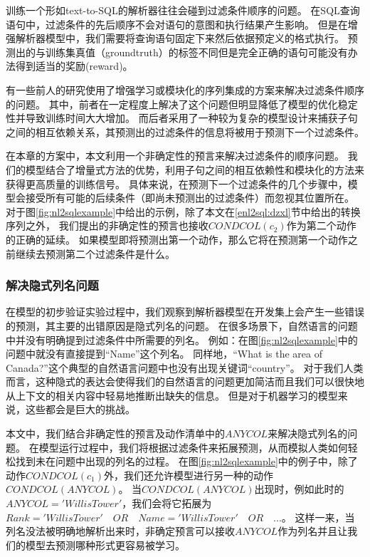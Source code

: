 训练一个形如text-to-SQL的解析器往往会碰到过滤条件顺序的问题。
在SQL查询语句中，过滤条件的先后顺序不会对语句的意图和执行结果产生影响。
但是在增强解析器模型中，我们需要将查询语句固定下来然后依据预定义的格式执行。
预测出的与训练集真值（groundtruth）的标签不同但是完全正确的语句可能没有办法得到适当的奖励(reward)。

有一些前人的研究使用了增强学习\cite{zhong2017seq2sql}或模块化的序列集成\cite{xu2017sqlnet}的方案来解决过滤条件顺序的问题。
其中，前者在一定程度上解决了这个问题但明显降低了模型的优化稳定性并导致训练时间大大增加。
而后者采用了一种较为复杂的模型设计来捕获子句之间的相互依赖关系，其预测出的过滤条件的信息将被用于预测下一个过滤条件。

在本章的方案中，本文利用一个非确定性的预言来解决过滤条件的顺序问题。
我们的模型结合了增量式方法的优势，利用子句之间的相互依赖性和模块化的方法来获得更高质量的训练信号。
具体来说，在预测下一个过滤条件的几个步骤中，模型会接受所有可能的后续条件（即尚未预测出的过滤条件）而忽视其位置所在。
对于图\ref{fig:nl2sqlexample}中给出的示例，除了本文在\ref{enl2sql:dzxl}节中给出的转换序列之外，
我们提出的非确定性的预言也接收$CONDCOL(c_2)$作为第二个动作的正确的延续。
如果模型即将预测出第一个动作，那么它将在预测第一个动作之前继续去预测第二个过滤条件是什么。
\subsubsection{解决隐式列名问题}
\label{enl2sql:icn}
在模型的初步验证实验过程中，我们观察到解析器模型在开发集上会产生一些错误的预测，其主要的出错原因是隐式列名的问题。
在很多场景下，自然语言的问题中并没有明确提到过滤条件中所需要的列名。
例如：在图\ref{fig:nl2sqlexample}中的问题中就没有直接提到“Name”这个列名。
同样地，“What is the area of Canada?”这个典型的自然语言问题中也没有出现关键词“country”。
对于我们人类而言，这种隐式的表达会使得我们的自然语言的问题更加简洁而且我们可以很快地从上下文的相关内容中轻易地推断出缺失的信息。
但是对于机器学习的模型来说，这些都会是巨大的挑战。

本文中，我们结合非确定性的预言及动作清单中的$ANYCOL$来解决隐式列名的问题。
在模型运行过程中，我们将根据过滤条件来拓展预测，从而模拟人类如何轻松找到未在问题中出现的列名的过程。
在图\ref{fig:nl2sqlexample}中的例子中，除了动作$CONDCOL(c_1)$外，我们还允许模型进行另一种的动作$CONDCOL(ANYCOL)$。
当$CONDCOL(ANYCOL)$出现时，例如此时的$ANYCOL='Willis Tower'$，我们会将它拓展为$Rank='Willis Tower' \quad OR \quad Name='Willis Tower' \quad OR \quad ...$。
这样一来，当列名没法被明确地解析出来时，非确定预言可以接收$ANYCOL$作为列名并且让我们的模型去预测哪种形式更容易被学习。


